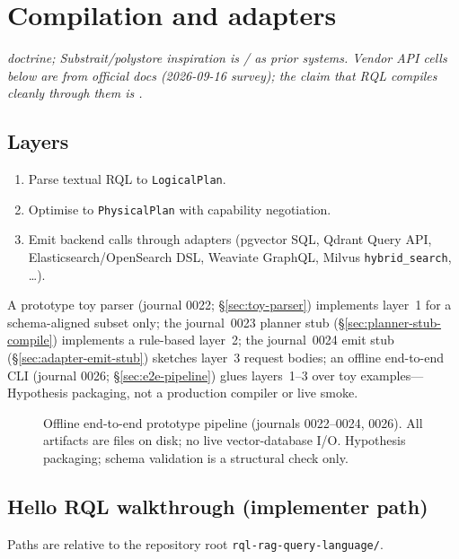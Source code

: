 \section{Compilation and adapters}
\label{sec:compilation}

\noindent\textit{\hypothesis{} doctrine; Substrait/polystore inspiration is \provisional{}/\established{} as prior systems.
Vendor API cells below are \established{} from official docs (2026-09-16 survey); the claim that RQL compiles cleanly through them is \hypothesis{}.}

\subsection{Layers}
\begin{enumerate}
  \item Parse textual RQL to \texttt{LogicalPlan}.
  \item Optimise to \texttt{PhysicalPlan} with capability negotiation.
  \item Emit backend calls through adapters (pgvector SQL, Qdrant Query API, Elasticsearch/OpenSearch DSL, Weaviate GraphQL, Milvus \texttt{hybrid\_search}, \ldots).
\end{enumerate}

A prototype toy parser (journal 0022; \S\ref{sec:toy-parser}) implements layer~1 for a schema-aligned subset only; the journal~0023 planner stub (\S\ref{sec:planner-stub-compile}) implements a rule-based layer~2; the journal~0024 emit stub (\S\ref{sec:adapter-emit-stub}) sketches layer~3 request bodies; an offline end-to-end CLI (journal 0026; \S\ref{sec:e2e-pipeline}) glues layers~1--3 over toy examples---Hypothesis packaging, not a production compiler or live smoke.

\begin{figure}[t]
\centering

\caption{Offline end-to-end prototype pipeline (journals 0022--0024, 0026).
All artifacts are files on disk; no live vector-database I/O.
Hypothesis packaging; schema validation is a structural check only.}
\label{fig:e2e-pipeline}
\end{figure}

\subsection{Hello RQL walkthrough (implementer path)}
\label{sec:hello-rql}
Paths are relative to the repository root \texttt{rql-rag-query-language/}.


